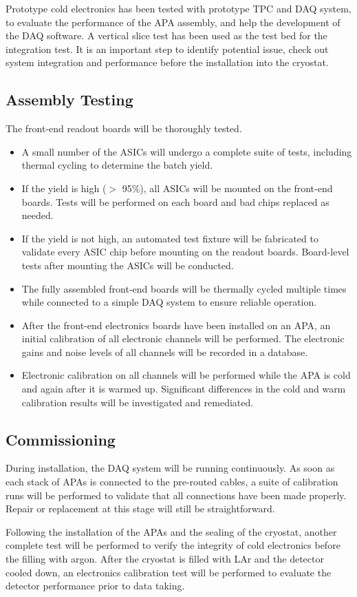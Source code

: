 Prototype cold electronics has been tested with prototype TPC and DAQ system,
to evaluate the performance of the APA assembly, and help the development of the DAQ software.
A vertical slice test has been used as the test bed for the integration test.
It is an important step to identify potential issue, check out system integration and performance
before the installation into the cryostat.

\subsection{Assembly Testing}
\label{sec:ce_install_assembly}

The front-end readout boards will be thoroughly tested.
\begin{itemize}
\item A small number of the ASICs will undergo a complete suite 
of tests, including thermal cycling to determine the batch yield.
\item If the yield is high ($>$ 95\%), all ASICs will be mounted 
on the front-end boards.
Tests will be performed on each board and bad chips replaced as needed.
\item If the yield is not high, an automated test fixture will be 
fabricated to validate every ASIC chip before mounting on the readout boards.
Board-level tests after mounting the ASICs will be conducted.
\item The fully assembled front-end boards will be thermally cycled multiple times while connected
to a simple DAQ system to ensure reliable operation.
\item After the front-end electronics boards have been installed on an APA,
an initial calibration of all electronic channels will be performed.
The electronic gains and noise levels of all channels will be recorded in a database.
\item Electronic calibration on all channels will be performed while the APA is cold and again after it is warmed up.
Significant differences in the cold and warm calibration results will be investigated and remediated.  
\end{itemize}

%
\subsection{Commissioning } 
\label{sec:ce_install_commission}

During installation, the DAQ system will be running continuously.
As soon as each stack of APAs is connected to the pre-routed cables, 
a suite of calibration runs will be performed to validate that all connections have been made properly.
Repair or replacement at this stage will still be straightforward.

Following the installation of the APAs and the sealing of the cryostat,
another complete test will be performed to verify the integrity of cold electronics before the filling with argon.
After the cryostat is filled with LAr and the detector cooled down,
an electronics calibration test will be performed to evaluate
the detector performance prior to data taking.

%

